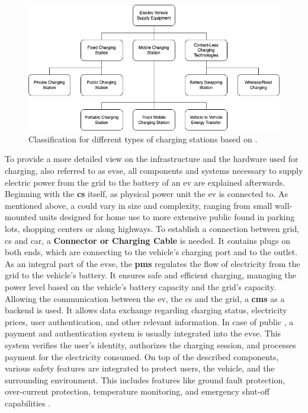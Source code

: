 \begin{figure}[h]
\centering
\includegraphics[scale=0.4]{resources/images/main/1_fundamentals/ChargingStationClassification.png}
\caption{Classification for different types of charging stations based on \cite{afshar_literature_2020}.}
\label{fig:charging-station-classification}
\end{figure}

\noindent To provide a more detailed view on the infrastructure and the hardware used for charging, also referred to as \acrfull{evse}, all components and systems necessary to supply electric power from the grid to the battery of an \acrfull{ev} are explained afterwards.
Beginning with the \textbf{\acrfull{cs}} itself, as physical power unit the \acrshort{ev} is connected to. As mentioned above, a  could vary in size and complexity, ranging from small wall-mounted units designed for home use to more extensive public  found in parking lots, shopping centers or along highways. 
To establish a connection between grid, \acrshort{cs} and car, a \textbf{Connector or Charging Cable} is needed. It contains plugs on both ends, which are connecting to the vehicle's charging port and to the  outlet. 
As an integral part of the \acrshort{evse}, the \textbf{\acrshort{pms}} regulates the flow of electricity from the grid to the vehicle's battery. It ensures safe and efficient charging, managing the power level based on the vehicle's battery capacity and the grid's capacity.
Allowing the communication between the \acrshort{ev}, the \acrfull{cs} and the grid, a \textbf{\acrshort{cms}} as a backend is used. It allows data exchange regarding charging status, electricity prices, user authentication, and other relevant information.
In case of public , a payment and authentication system is usually integrated into the \acrshort{evse}. This system verifies the user's identity, authorizes the charging session, and processes payment for the electricity consumed.
On top of the described components, various safety features are integrated to protect users, the vehicle, and the surrounding environment. This includes features like ground fault protection, over-current protection, temperature monitoring, and emergency shut-off capabilities \cite{littlefuse_designing_2020}.

